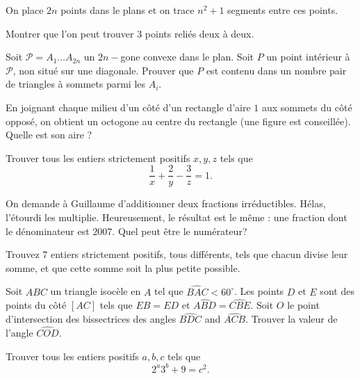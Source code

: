 \begin{exo}{}
On place $2n$ points dans le plans et on trace $n^2+1$ segments entre ces points. 

Montrer que l'on peut trouver 3 points reli\'es deux \`a deux.
\end{exo}

\begin{exo}{}
Soit $\mathcal{P}=A_1\ldots A_{2n}$ un $2n-$gone convexe dans le plan. Soit $P$ un point intérieur à $\mathcal{P}$, non situé sur une diagonale. Prouver que $P$ est contenu dans un nombre pair de triangles à sommets parmi les $A_i$.
\end{exo}

\begin{exo}{}En joignant chaque milieu d'un côté d'un rectangle d'aire $1$ aux sommets du côté opposé, on obtient un octogone au centre du rectangle (une figure est conseillée). Quelle est son aire ? 
\end{exo}

\begin{exo}{}
Trouver tous les entiers strictement positifs $x,y,z$ tels que $$\frac{1}{x}+\frac{2}{y}-\frac{3}{z}=1.$$
\end{exo}


\begin{exo}{}On demande à Guillaume d'additionner deux fractions irréductibles. Hélas, l'étourdi les multiplie. Heureusement, le résultat est le même : une fraction dont le dénominateur est $2007$. Quel peut être le numérateur?
\end{exo}

\begin{exo}{} Trouvez $7$ entiers strictement positifs, tous différents, tels que chacun divise leur somme, et que cette somme soit la plus petite possible.
\end{exo}


\begin{exo}{}
Soit $ABC$ un triangle isocèle en $A$ tel que $\widehat{BAC}<60^{\circ}$. Les points $D$ et $E$ sont des points du côté $[AC]$ tels que $EB=ED$ et $\widehat{ABD}=\widehat{CBE}$. Soit $O$ le point d'intersection des bissectrices des angles $\widehat{BDC}$ and $\widehat{ACB}$. Trouver la valeur de l'angle $\widehat{COD}$.
\end{exo}

\begin{exo}{}Trouver tous les entiers positifs $a,b,c$ tels que $$ 2^{a}3^{b}+9 = c^{2}.$$
\end{exo} 

